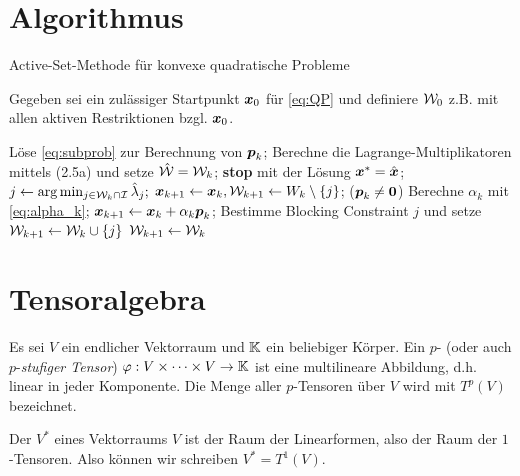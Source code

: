 \section{Algorithmus}
\label{anhang:B.3}

\begin{algorithm}[H]
\caption{Active-Set-Methode für konvexe quadratische Probleme}
Gegeben sei ein zulässiger Startpunkt $\boldsymbol x_0$ für \eqref{eq:QP} und definiere $\mathcal W_0$ z.B. mit allen aktiven Restriktionen bzgl. $\boldsymbol x_0$.
\begin{algorithmic}
\State Löse \eqref{eq:subprob} zur Berechnung von $\boldsymbol p_k$;
\State Berechne die Lagrange-Multiplikatoren mittels (2.5a)
\State \quad und setze $\hat{\mathcal W} = \mathcal W_k$;
\State \textbf{stop} mit der Lösung $\boldsymbol x^* = \hat{\boldsymbol x}$;
\Else
\State $j \leftarrow \arg\min_{j\in \mathcal W_k \cap \mathcal I} \hat\lambda_j;$
\State $\boldsymbol x_{k+1} \leftarrow \boldsymbol x_k, \mathcal W_{k+1} \leftarrow W_k \setminus \{j\}$;
\EndIf
\Else \quad ($\boldsymbol p_k \not= \boldsymbol 0$)
\State Berechne $\alpha_k$ mit \eqref{eq:alpha_k};
\State $\boldsymbol x_{k+1} \leftarrow  \boldsymbol x_k + \alpha_k\boldsymbol p_k$;
\State Bestimme  Blocking Constraint $j$ und setze $\mathcal W_{k+1} \leftarrow \mathcal W_k \cup \{j\}$
\Else
\State $\mathcal W_{k+1} \leftarrow \mathcal W_k$
\EndIf
\EndIf
\EndFor
\end{algorithmic}
\end{algorithm}







\label{anhang:C}


\section{Tensoralgebra}
\label{kap:C.1}


\begin{defi}\label{def:C.1}
Es sei $V$ ein endlicher Vektorraum und $\mathbb{K}$ ein beliebiger Körper. Ein $p$-\textit{} (oder auch $p$-\textit{stufiger Tensor}) $\varphi: V\times \dots \times V \rightarrow \mathbb{K}$ ist eine multilineare Abbildung, d.h. linear in jeder Komponente. Die Menge aller $p$-Tensoren über $V$ wird mit $T^p(V)$ bezeichnet.
\end{defi}

\begin{bsp}\label{bsp:C.2}
Der  $V^*$ eines Vektorraums $V$ ist der Raum der Linearformen, also der Raum der $1$-Tensoren. Also können wir schreiben $V^* = T^1(V)$.
\end{bsp}

